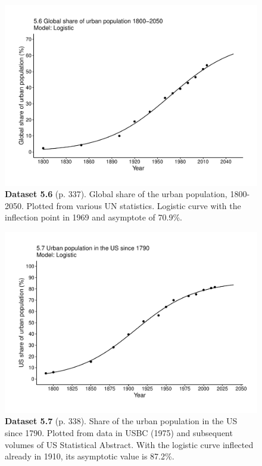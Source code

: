\documentclass[aps,rmp,preprint,superscriptaddress,10pt,onecolumn]{article}
\begin{document}
\clearpage
\begin{figure}[h]
\includegraphics[width=\textwidth]{output/figs-ggplot/5.6.pdf}
\caption*{\textbf{Dataset 5.6} (p. 337). Global share of the urban population, 1800-2050. Plotted from various UN statistics. Logistic curve with the inflection point in 1969 and asymptote of 70.9\%.}
\end{figure}
	
\clearpage
\begin{figure}[h]
\includegraphics[width=\textwidth]{output/figs-ggplot/5.7.pdf}
\caption*{\textbf{Dataset 5.7} (p. 338). Share of the urban population in the US since 1790. Plotted from data in USBC (1975) and subsequent volumes of US Statistical Abstract. With the logistic curve inflected already in 1910, its asymptotic value is 87.2\%.}
\end{figure}
	
\end{document}
